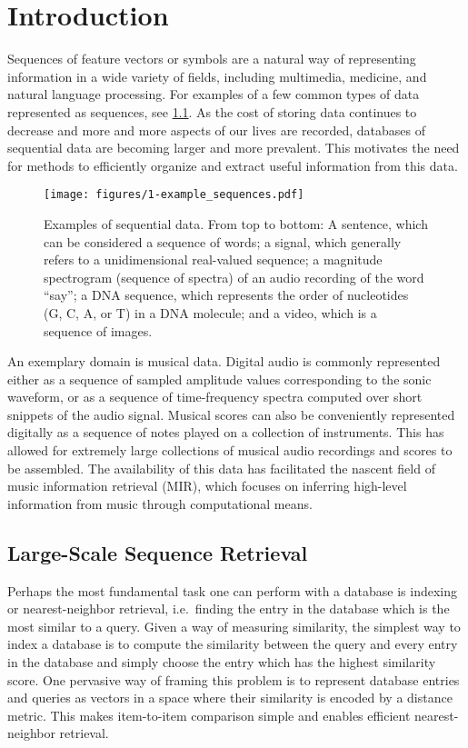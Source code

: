 \chapter{Introduction}

Sequences of feature vectors or symbols are a natural way of representing information in a wide variety of fields, including multimedia, medicine, and natural language processing.
For examples of a few common types of data represented as sequences, see \cref{fig:example_sequences}.
As the cost of storing data continues to decrease and more and more aspects of our lives are recorded, databases of sequential data are becoming larger and more prevalent.
This motivates the need for methods to efficiently organize and extract useful information from this data.

\begin{figure}
  \texttt{[image: figures/1-example\_sequences.pdf]}
  \caption[Examples of sequential data]{Examples of sequential data.  From top to bottom: A sentence, which can be considered a sequence of words; a signal, which generally refers to a unidimensional real-valued sequence; a magnitude spectrogram (sequence of spectra) of an audio recording of the word ``say''; a DNA sequence, which represents the order of nucleotides (G, C, A, or T) in a DNA molecule; and a video, which is a sequence of images.}
  \label{fig:example_sequences}
\end{figure}

An exemplary domain is musical data.
Digital audio is commonly represented either as a sequence of sampled amplitude values corresponding to the sonic waveform, or as a sequence of time-frequency spectra computed over short snippets of the audio signal.
Musical scores can also be conveniently represented digitally as a sequence of notes played on a collection of instruments.
This has allowed for extremely large collections of musical audio recordings and scores to be assembled.
The availability of this data has facilitated the nascent field of music information retrieval (MIR), which focuses on inferring high-level information from music through computational means.

\section{Large-Scale Sequence Retrieval}

Perhaps the most fundamental task one can perform with a database is indexing or nearest-neighbor retrieval, i.e.\ finding the entry in the database which is the most similar to a query.
Given a way of measuring similarity, the simplest way to index a database is to compute the similarity between the query and every entry in the database and simply choose the entry which has the highest similarity score.
One pervasive way of framing this problem is to represent database entries and queries as vectors in a space where their similarity is encoded by a distance metric.
This makes item-to-item comparison simple and enables efficient nearest-neighbor retrieval.


